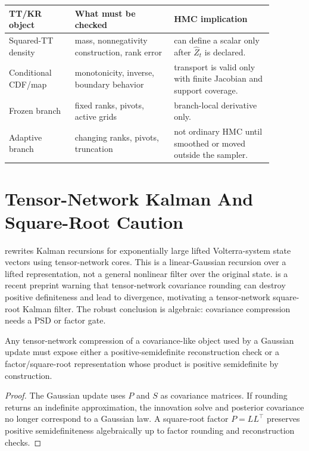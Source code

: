 \begin{longtable}{@{}p{0.22\linewidth}p{0.33\linewidth}p{0.33\linewidth}@{}}
\toprule
TT/KR object & What must be checked & HMC implication \\
\midrule
\endhead
Squared-TT density & mass, nonnegativity construction, rank error & can define
a scalar only after \(\widehat Z_t\) is declared. \\
Conditional CDF/map & monotonicity, inverse, boundary behavior & transport is
valid only with finite Jacobian and support coverage. \\
Frozen branch & fixed ranks, pivots, active grids & branch-local derivative
only. \\
Adaptive branch & changing ranks, pivots, truncation & not ordinary HMC until
smoothed or moved outside the sampler. \\
\bottomrule
\end{longtable}

\section{Tensor-Network Kalman And Square-Root Caution}
\label{sec:bf-hd-tn-kalman}

\citet{batselier2016tnkf} rewrites Kalman recursions for exponentially large
lifted Volterra-system state vectors using tensor-network cores.  This is a
linear-Gaussian recursion over a lifted representation, not a general
nonlinear filter over the original state.  \citet{menzen2024tnsrkf} is a
recent preprint warning that tensor-network covariance rounding can destroy
positive definiteness and lead to divergence, motivating a tensor-network
square-root Kalman filter.  The robust conclusion is algebraic: covariance
compression needs a PSD or factor gate.

\begin{proposition}
\label{prop:bf-hd-factor-gate}
Any tensor-network compression of a covariance-like object used by a Gaussian
update must expose either a positive-semidefinite reconstruction check or a
factor/square-root representation whose product is positive semidefinite by
construction.
\end{proposition}

\begin{proof}
The Gaussian update uses \(P\) and \(S\) as covariance matrices.  If rounding
returns an indefinite approximation, the innovation solve and posterior
covariance no longer correspond to a Gaussian law.  A square-root factor
\(P=LL^\top\) preserves positive semidefiniteness algebraically up to factor
rounding and reconstruction checks.
\end{proof}

